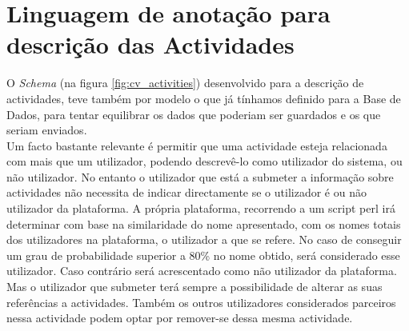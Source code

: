 \documentclass[a4paper,11pt,openright,openbib]{article}
\begin{document}
\section{Linguagem de anotação para descrição das Actividades}
O \emph{Schema} (na figura \ref{fig:cv_activities}) desenvolvido para a descrição de actividades, teve também por modelo o que já tínhamos definido para a Base de Dados, para tentar equilibrar os dados que poderiam ser guardados e os que seriam enviados.\\
Um facto bastante relevante é permitir que uma actividade esteja relacionada com mais que um utilizador, podendo descrevê-lo como utilizador do sistema, ou não utilizador. No entanto o utilizador que está a submeter a informação sobre actividades não necessita de indicar directamente se o utilizador é ou não utilizador da plataforma. A própria plataforma, recorrendo a um script perl irá determinar com base na similaridade do nome apresentado, com os nomes totais dos utilizadores na plataforma, o utilizador a que se refere. No caso de conseguir um grau de probabilidade superior a 80\% no nome obtido, será considerado esse utilizador. Caso contrário será acrescentado como não utilizador da plataforma. Mas o utilizador que submeter terá sempre a possibilidade de alterar as suas referências a actividades. Também os outros utilizadores considerados parceiros nessa actividade podem optar por remover-se dessa mesma actividade.
\end{document}
